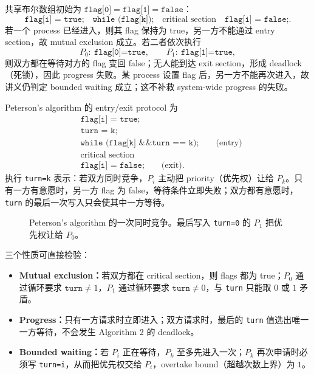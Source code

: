 
共享布尔数组初始为 $\texttt{flag[0]}=\texttt{flag[1]}=\texttt{false}$：
\[
  \texttt{flag[i] = true;}\quad
  \texttt{while (flag[k]);}\quad
  \text{critical section}\quad
  \texttt{flag[i] = false;}.
\]
若一个 process 已经进入，则其 flag 保持为 true，另一方不能通过 entry section，故 mutual exclusion 成立。若二者依次执行
\[
  P_0:\ \texttt{flag[0]=true},\qquad
  P_1:\ \texttt{flag[1]=true},
\]
则双方都在等待对方的 flag 变回 false；无人能到达 exit section，形成 deadlock（死锁），因此 progress 失败。某 process 设置 flag 后，另一方不能再次进入，故讲义仍判定 bounded waiting 成立；这不补救 system-wide progress 的失败。



Peterson's algorithm 的 entry/exit protocol 为
\[
\begin{aligned}
  &\texttt{flag[i] = true;}\\
  &\texttt{turn = k;}\\
  &\texttt{while (flag[k] \&\& turn == k);}\qquad\text{(entry)}\\
  &\text{critical section}\\
  &\texttt{flag[i] = false;}\qquad\text{(exit)}.
\end{aligned}
\]
执行 \texttt{turn=k} 表示：若双方同时竞争，$P_i$ 主动把 priority（优先权）让给 $P_k$。只有一方有意愿时，另一方 flag 为 false，等待条件立即失败；双方都有意愿时，\texttt{turn} 的最后一次写入只会使其中一方等待。

\begin{figure}[htbp]
  \centering
  \resizebox{0.96\textwidth}{!}{}
  \caption{Peterson's algorithm 的一次同时竞争。最后写入 \texttt{turn=0} 的 $P_1$ 把优先权让给 $P_0$。}
  \label{fig:sc2005-l08-peterson}
\end{figure}

三个性质可直接检验：
\begin{itemize}
  \item \textbf{Mutual exclusion：}若双方都在 critical section，则 flags 都为 true；$P_0$ 通过循环要求 $\texttt{turn}\ne1$，$P_1$ 通过循环要求 $\texttt{turn}\ne0$，与 \texttt{turn} 只能取 $0$ 或 $1$ 矛盾。
  \item \textbf{Progress：}只有一方请求时立即进入；双方请求时，最后的 \texttt{turn} 值选出唯一一方等待，不会发生 Algorithm 2 的 deadlock。
  \item \textbf{Bounded waiting：}若 $P_i$ 正在等待，$P_k$ 至多先进入一次；$P_k$ 再次申请时必须写 \texttt{turn=i}，从而把优先权交给 $P_i$，overtake bound（超越次数上界）为 $1$。
\end{itemize}

